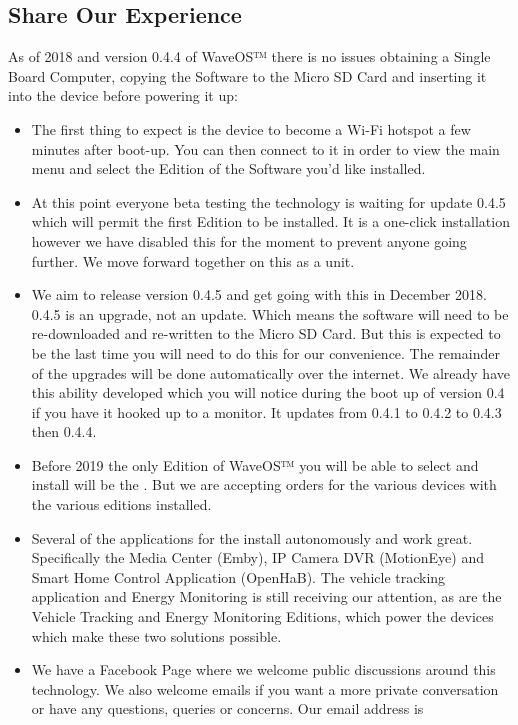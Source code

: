 \documentclass[letterpaper,10pt,openany,oneside,english]{sphinxmanual}
\begin{document}
\subsection{Share Our Experience}
\label{\detokenize{preperation:share-our-experience}}
As of 2018 and version 0.4.4 of WaveOS™ there is no issues obtaining a Single Board Computer, copying the Software to the Micro SD Card and inserting it into the device before powering it up:
\begin{itemize}
\item {} 
The first thing to expect is the device to become a Wi-Fi hotspot a few minutes after boot-up. You can then connect to it in order to view the main menu and select the Edition of the Software you’d like installed.

\item {} 
At this point everyone beta testing the technology is waiting for update 0.4.5 which will permit the first Edition to be installed. It is a one-click installation however we have disabled this for the moment to prevent anyone going further. We move forward together on this as a unit.

\item {} 
We aim to release version 0.4.5 and get going with this in December 2018. 0.4.5 is an upgrade, not an update. Which means the software will need to be re-downloaded and re-written to the Micro SD Card. But this is expected to be the last time you will need to do this for our convenience. The remainder of the upgrades will be done automatically over the internet. We already have this ability developed which you will notice during the boot up of version 0.4 if you have it hooked up to a monitor. It updates from 0.4.1 to 0.4.2 to 0.4.3 then 0.4.4.

\item {} 
Before 2019 the only Edition of WaveOS™ you will be able to select and install will be the . But we are accepting orders for the various devices with the various editions installed.

\item {} 
Several of the applications for the  install autonomously and work great. Specifically the Media Center (Emby), IP Camera DVR (MotionEye) and Smart Home Control Application (OpenHaB). The vehicle tracking application and Energy Monitoring is still receiving our attention, as are the Vehicle Tracking and Energy Monitoring Editions, which power the devices which make these two solutions possible.

\item {} 
We have a Facebook Page where we welcome public discussions around this technology. We also welcome emails if you want a more private conversation or have any questions, queries or concerns. Our email address is 

\end{itemize}
\end{document}
